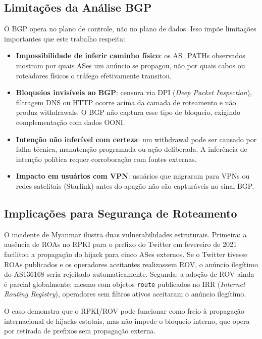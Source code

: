 \documentclass[12pt]{article}
\begin{document}
\subsection{Limitações da Análise BGP}

O BGP opera no plano de controle, não no plano de dados. Isso impõe limitações
importantes que este trabalho respeita:

\begin{itemize}
  \item \textbf{Impossibilidade de inferir caminho físico}: os AS\_PATHs
    observados mostram por quais ASes um anúncio se propagou, não por quais
    cabos ou roteadores físicos o tráfego efetivamente transitou.
  \item \textbf{Bloqueios invisíveis ao BGP}: censura via DPI
    (\textit{Deep Packet Inspection}), filtragem DNS ou HTTP ocorre acima da
    camada de roteamento e não produz withdrawals. O BGP não captura esse tipo
    de bloqueio, exigindo complementação com dados OONI.
  \item \textbf{Intenção não inferível com certeza}: um withdrawal pode ser
    causado por falha técnica, manutenção programada ou ação deliberada. A
    inferência de intenção política requer corroboração com fontes externas.
  \item \textbf{Impacto em usuários com VPN}: usuários que migraram para VPNs
    ou redes satelitais (Starlink) antes do apagão não são capturáveis no
    sinal BGP.
\end{itemize}

\subsection{Implicações para Segurança de Roteamento}

O incidente de Myanmar ilustra duas vulnerabilidades estruturais. Primeira: a
ausência de ROAs no RPKI para o prefixo do Twitter em fevereiro de 2021
facilitou a propagação do hijack para cinco ASes externos. Se o Twitter
tivesse ROAs publicados e os operadores aceitantes realizassem ROV, o anúncio
ilegítimo do AS136168 seria rejeitado automaticamente. Segunda: a adoção de
ROV ainda é parcial globalmente; mesmo com objetos \texttt{route} publicados
no IRR (\textit{Internet Routing Registry}), operadores sem filtros ativos
aceitaram o anúncio ilegítimo.

O caso demonstra que o RPKI/ROV pode funcionar como freio à propagação
internacional de hijacks estatais, mas não impede o bloqueio interno, que
opera por retirada de prefixos sem propagação externa.
\end{document}
